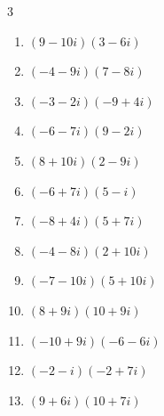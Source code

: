 \begin{multicols}{3}
\begin{enumerate}
        \phantom{$\displaystyle =-13+35i$}

  \item $\displaystyle (9-10i)(3-6i)$

        \phantom{$\displaystyle =-33-84i$}

  \item $\displaystyle (-4-9i)(7-8i)$

        \phantom{$\displaystyle =-100-31i$}

  \item $\displaystyle (-3-2i)(-9+4i)$

        \phantom{$\displaystyle =35+6i$}

  \item $\displaystyle (-6-7i)(9-2i)$

        \phantom{$\displaystyle =-68-51i$}

  \item $\displaystyle (8+10i)(2-9i)$

        \phantom{$\displaystyle =106-52i$}

  \item $\displaystyle (-6+7i)(5-i)$

        \phantom{$\displaystyle =-23+41i$}

\columnbreak %

  \item $\displaystyle (-8+4i)(5+7i)$

        \phantom{$\displaystyle =-68-36i$}

  \item $\displaystyle (-4-8i)(2+10i)$

        \phantom{$\displaystyle =72-56i$}

  \item $\displaystyle (-7-10i)(5+10i)$

        \phantom{$\displaystyle =65-120i$}

  \item $\displaystyle (8+9i)(10+9i)$

        \phantom{$\displaystyle =-1+162i$}

  \item $\displaystyle (-10+9i)(-6-6i)$

        \phantom{$\displaystyle =114+6i$}

  \item $\displaystyle (-2-i)(-2+7i)$

        \phantom{$\displaystyle =11-12i$}

  \item $\displaystyle (9+6i)(10+7i)$


\end{enumerate}
\end{multicols}
